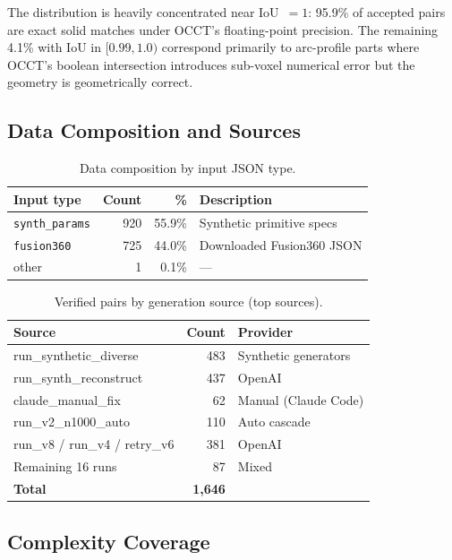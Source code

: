 The distribution is heavily concentrated near IoU~$= 1$: 95.9\% of accepted pairs are exact solid matches under OCCT's floating-point precision. The remaining 4.1\% with IoU in $[0.99, 1.0)$ correspond primarily to arc-profile parts where OCCT's boolean intersection introduces sub-voxel numerical error but the geometry is geometrically correct.

\subsection{Data Composition and Sources}

\begin{table}[h]
\centering
\small
\caption{Data composition by input JSON type.}
\label{tab:jsontype}
\begin{tabular}{lrrl}
\toprule
\textbf{Input type} & \textbf{Count} & \textbf{\%} & \textbf{Description} \\
\midrule
\texttt{synth\_params} & 920 & 55.9\% & Synthetic primitive specs \\
\texttt{fusion360}    & 725 & 44.0\% & Downloaded Fusion360 JSON \\
other                & 1   & 0.1\%  & --- \\
\bottomrule
\end{tabular}
\end{table}

\begin{table}[h]
\centering
\small
\caption{Verified pairs by generation source (top sources).}
\label{tab:sources}
\begin{tabular}{lrl}
\toprule
\textbf{Source} & \textbf{Count} & \textbf{Provider} \\
\midrule
run\_synthetic\_diverse     & 483 & Synthetic generators \\
run\_synth\_reconstruct     & 437 & OpenAI \\
claude\_manual\_fix         &  62 & Manual (Claude Code) \\
run\_v2\_n1000\_auto        & 110 & Auto cascade \\
run\_v8 / run\_v4 / retry\_v6 & 381 & OpenAI \\
Remaining 16 runs           &  87 & Mixed \\
\textbf{Total}              & \textbf{1,646} & \\
\bottomrule
\end{tabular}
\end{table}

\subsection{Complexity Coverage}

